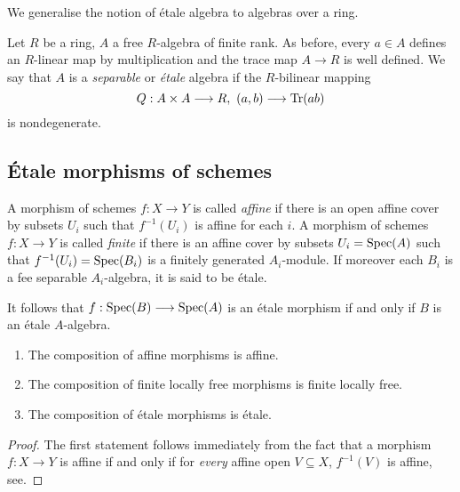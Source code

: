 We generalise the notion of \'etale algebra to algebras over a ring.

\begin{definition}
  Let $R$ be a ring, $A$ a free $R$-algebra of finite rank. As before, every $a \in A$ defines an $R$-linear map by multiplication and the trace map $A \to R$ is well defined. We say that $A$ is a \textit{separable} or \textit{\'etale} algebra if the $R$-bilinear mapping 
  \[
    Q : A \times A \longrightarrow R,\ (a,b) \longrightarrow \operatorname{Tr}(ab)
  \]
  is nondegenerate.
\end{definition}

\subsection{\'Etale morphisms of schemes}
\begin{definition}
A morphism of schemes $f: X \to Y$ is called \textit{affine} if there is an open affine cover by subsets $U_i$ such that $f^{-1}(U_i)$ is affine for each $i$.  A morphism of schemes $f: X \to Y$ is called \textit{finite} if there is an affine cover by subsets $U_i = \operatorname{Spec}(A)$ such that $f^{-1}(U_i) = \operatorname{Spec}(B_i)$ is a finitely generated $A_i$-module.  If moreover each $B_i$ is a fee separable $A_i$-algebra, it is said to be \'etale.
\end{definition}
It follows that $f: \operatorname{Spec}(B) \longrightarrow \operatorname{Spec}(A)$ is an \'etale morphism if and only if $B$ is an \'etale $A$-algebra.

\begin{lemma}
  \begin{enumerate}
    \item The composition of affine morphisms is affine.
    \item The composition of finite locally free morphisms is finite locally free.
    \item The composition of \'etale morphisms is \'etale.
  \end{enumerate}
\end{lemma}
\begin{proof}
  The first statement follows immediately from the fact that a morphism $f: X \to Y$ is affine if and only if for \textit{every} affine open $V \subseteq X$, $f^{-1}(V)$ is affine, see\cite{Hartshorne}.
\end{proof}


